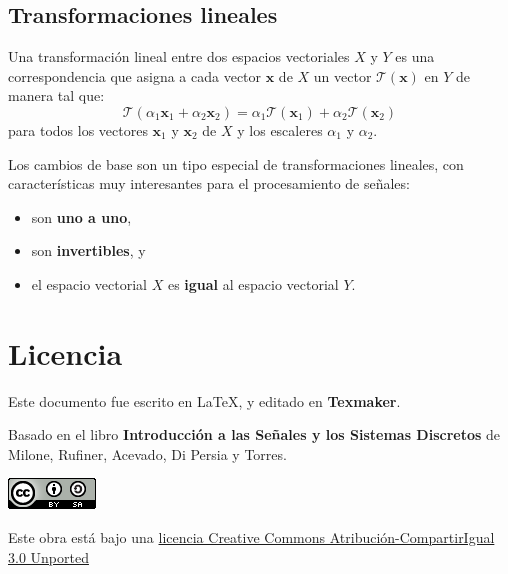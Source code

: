 \documentclass[10pt,a4paper]{book}
\begin{document}
\section{Transformaciones lineales}
Una transformación lineal entre dos espacios vectoriales $X$ y $Y$ es una correspondencia que asigna a cada vector $\mathbf{x}$ de $X$ un vector $\mathcal{T}(\mathbf{x})$ en $Y$ de manera tal que: 
\[\mathcal{T}(\alpha_1\mathbf{x}_1+\alpha_2\mathbf{x}_2)=\alpha_1\mathcal{T}(\mathbf{x}_1) + \alpha_2\mathcal{T}(\mathbf{x}_2)\]
para todos los vectores $\mathbf{x}_1$ y $\mathbf{x}_2$ de $X$ y los escaleres $\alpha_1$ y $\alpha_2$.

Los cambios de base son un tipo especial de transformaciones lineales, con características muy interesantes para el procesamiento de señales:
\begin{itemize}
\item son \textbf{uno a uno},
\item son \textbf{invertibles}, y
\item el espacio vectorial $X$ es \textbf{igual} al espacio vectorial $Y$.
\end{itemize}






\chapter*{Licencia}
\begin{center}
Este documento fue escrito en \LaTeX, y editado en \textbf{Texmaker}.

Basado en el libro \textbf{Introducción a las Señales y los Sistemas Discretos} de Milone, Rufiner, Acevado, Di Persia y Torres.
\vfill

\href{http://creativecommons.org/licenses/by-sa/3.0/}{
\includegraphics{CC.png}}

Este obra está bajo una \href{http://creativecommons.org/licenses/by-sa/3.0/}{licencia Creative Commons Atribución-CompartirIgual 3.0 Unported}
\end{center}
\end{document}
